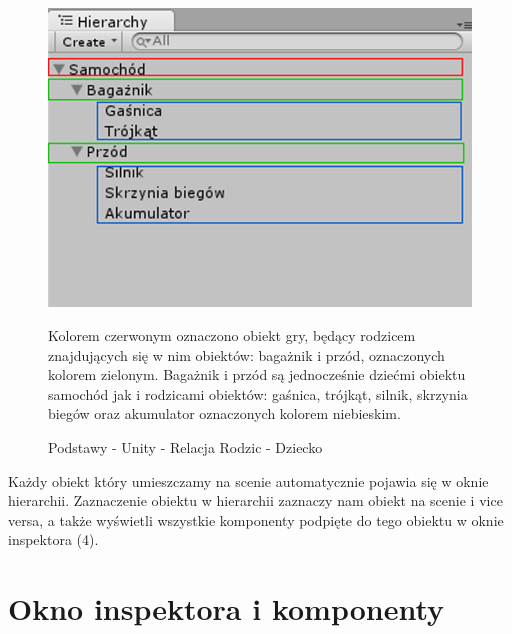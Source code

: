 \documentclass[12pt]{xmgr}
\begin{document}
\begin{figure}[!htb]
    \begin{center}
    \includegraphics[scale=0.25]{Screeny/rodzial5screeny/przyklad_relacji_rodzic_dziecko}
    \end{center}
    \caption{Podstawy - Unity - Relacja Rodzic - Dziecko}
Kolorem czerwonym oznaczono obiekt gry, będący rodzicem znajdujących się w nim obiektów: bagażnik i przód, oznaczonych kolorem zielonym. Bagażnik i przód są jednocześnie dziećmi obiektu samochód jak i rodzicami obiektów: gaśnica, trójkąt, silnik, skrzynia biegów oraz akumulator oznaczonych kolorem niebieskim.
\end{figure}

Każdy obiekt który umieszczamy na scenie automatycznie pojawia się w oknie hierarchii. Zaznaczenie obiektu w hierarchii zaznaczy nam obiekt na scenie i vice versa, a także wyświetli wszystkie komponenty podpięte do tego obiektu w oknie inspektora (4).

\section{Okno inspektora i komponenty}
\end{document}
